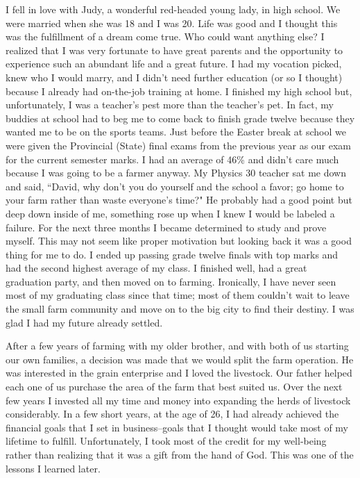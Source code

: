 \documentclass[oneside,12pt]{book}
\begin{document}
I fell in love with Judy, a wonderful red-headed young lady, in high school. We were married when she was 18 and I was 20. Life was good and I thought this was the fulfillment of a dream come true. Who could want anything else? I realized that I was very fortunate to have great parents and the opportunity to experience such an abundant life and a great future. I had my vocation picked, knew who I would marry, and I didn't need further education (or so I thought) because I already had on-the-job training at home. I finished my high school but, unfortunately, I was a teacher's pest more than the teacher's pet. In fact, my buddies at school had to beg me to come back to finish grade twelve because they wanted me to be on the sports teams. Just before the Easter break at school we were given the Provincial (State) final exams from the previous year as our exam for the current semester marks. I had an average of 46\% and didn't care much because I was going to be a farmer anyway. My Physics 30 teacher sat me down and said, ``David, why don't you do yourself and the school a favor; go home to your farm rather than waste everyone's time?" He probably had a good point but deep down inside of me, something rose up when I knew I would be labeled a failure. For the next three months I became determined to study and prove myself. This may not seem like proper motivation but looking back it was a good thing for me to do. I ended up passing grade twelve finals with top marks and had the second highest average of my class. I finished well, had a great graduation party, and then moved on to farming. Ironically, I have never seen most of my graduating class since that time; most of them couldn't wait to leave the small farm community and move on to the big city to find their destiny. I was glad I had my future already settled.

After a few years of farming with my older brother, and with both of us starting our own families, a decision was made that we would split the farm operation. He was interested in the grain enterprise and I loved the livestock. Our father helped each one of us purchase the area of the farm that best suited us. Over the next few years I invested all my time and money into expanding the herds of livestock considerably. In a few short years, at the age of 26, I had already achieved the financial goals that I set in business--goals that I thought would take most of my lifetime to fulfill. Unfortunately, I took most of the credit for my well-being rather than realizing that it was a gift from the hand of God. This was one of the lessons I learned later. 
\end{document}
